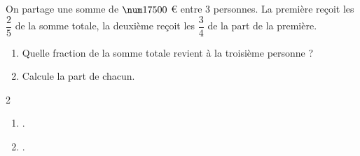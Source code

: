 \begin{exercice*}[Partage]
    On partage une somme de $\num17500$ € entre $3$ personnes. La première reçoit les $\dfrac25$
    de la somme totale, la deuxième reçoit les $\dfrac34$ de la part de la première.
    \begin{enumerate}
        \item Quelle fraction de la somme totale revient à la troisième personne ?
        \item Calcule la part de chacun.
    \end{enumerate}
\end{exercice*}
\begin{corrige}
    \phantom{rrr}    
    \begin{multicols}2
        \begin{enumerate}
            \item .
            \item .
        \end{enumerate}
    \end{multicols}
\end{corrige}

